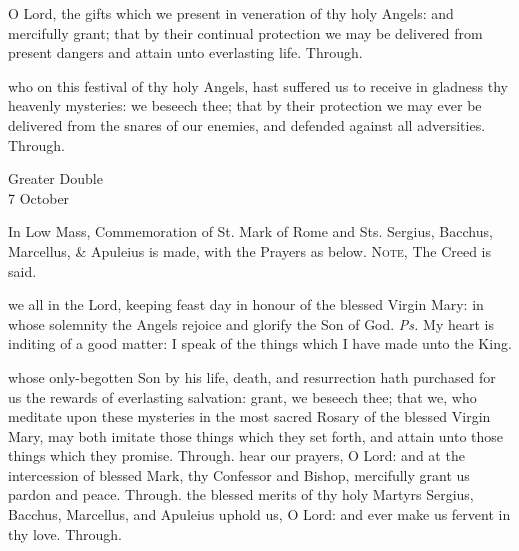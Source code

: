 
\secret
{} O Lord, the gifts which we present in veneration of thy holy Angels: and mercifully grant; that by their continual protection we may be delivered from present dangers and attain unto everlasting life. Through.


\postcommunion
{} who on this festival of thy holy Angels, hast suffered us to receive in gladness thy heavenly mysteries: we beseech thee; that by their protection we may ever be delivered from the snares of our enemies, and defended against all adversities. Through.

\begin{inhead}
	{Greater Double\\
		7 October}
\end{inhead}
\begin{rubric}
	In Low Mass, Commemoration of St. Mark of Rome and Sts. Sergius, Bacchus, Marcellus, \& Apuleius is made, with the Prayers as below.
	\textsc{Note,} The Creed is said.
\end{rubric}
\par\noindent
{}
\par\noindent
{}
\par\noindent
{}

\introit
{} we all in the Lord, keeping feast day in honour of the blessed Virgin Mary: in whose solemnity the Angels rejoice and glorify the Son of God. \textit{Ps.} My heart is inditing of a good matter: I speak of the things which I have made unto the King.

\collect
{} whose only-begotten Son by his life, death, and resurrection hath purchased for us the rewards of everlasting salvation: grant, we beseech thee; that we, who meditate upon these mysteries in the most sacred Rosary of the blessed Virgin Mary, may both imitate those things which they set forth, and attain unto those things which they promise. Through.
 hear our prayers, O Lord: and at the intercession of blessed Mark, thy Confessor and Bishop, mercifully grant us pardon and peace. Through.
 the blessed merits of thy holy Martyrs Sergius, Bacchus, Marcellus, and Apuleius uphold us, O Lord: and ever make us fervent in thy love. Through.


